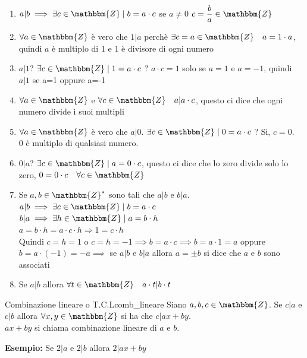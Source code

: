 \documentclass[12pt, letterpaper]{report}
\newcounter{theorem}
\newcommand{\nmu}{}
\begin{document}
		\begin{enumerate}
			\item $a|b \implies \exists c \in \mathbbm{Z} \mid b = a \cdot c$ se $a \neq 0$ $c = \dfrac{b}{a} \in \mathbbm{Z}$
			\item $\forall a \in \mathbbm{Z}$ è vero che $1|a$ perchè $\exists c=a \in \mathbbm{Z} \quad a = 1 \cdot a$, quindi $a$ è multiplo di 1 e 1 è divisore di ogni numero
			\item $a|1$? $\exists c \in \mathbbm{Z} \mid 1 = a \cdot c$ ? $a \cdot c = 1$ solo se $a=1$ e $a=-1$, quindi $a|1$ se a=1 oppure a=-1
			\item $\forall a \in \mathbbm{Z}$ e $\forall c \in \mathbbm{Z} \quad a|a \cdot c$, questo ci dice che ogni numero divide i suoi multipli
			\item $\forall a \in \mathbbm{Z}$ è vero che $a|0$. $\exists c \in \mathbbm{Z} \mid 0 = a \cdot c$ ? Si, $c = 0$. \\
			0 è multiplo di qualsiasi numero.
			\item $0|a$? $\exists c \in \mathbbm{Z} \mid a = 0 \cdot c$, questo ci dice che lo zero divide solo lo zero, $0=0 \cdot c \quad \forall c \in \mathbbm{Z}$
			\item Se $a,b \in \mathbbm{Z}^*$ sono tali che $a|b$ e $b|a$. \\
			$a|b \implies \exists c \in \mathbbm{Z} \mid b = a \cdot c$ \\
			$b|a \implies \exists h \in \mathbbm{Z} \mid a = b \cdot h$ \\
			$a = b \cdot h = a \cdot c \cdot h \Rightarrow 1 = c \cdot h$ \\
			Quindi $c=h=1$ o $c=h=-1 \implies b = a \cdot c \implies b = a \cdot 1 = a$ oppure $b = a \cdot (-1) = -a \implies$ se $a|b$ e $b|a$ allora $a=\pm b$ si dice che $a$ e $b$ sono associati
			\item Se $a|b$ allora $\forall t \in \mathbbm{Z} \quad a \cdot t|b \cdot t$
		\end{enumerate}
		\begin{theorem}{\nmu Combinazione lineare o T.C.L}{comb_lineare}
				Siano $a,b,c \in \mathbbm{Z}$. Se $c|a$ e $c|b$ allora $\forall x,y \in \mathbbm{Z}$ si ha che $c|ax + by$. \\
			$ax + by$ si chiama combinazione lineare di $a$ e $b$.
		\end{theorem}
		\textbf{Esempio:} Se $2|a$ e $2|b$ allora $2|ax + by$
\end{document}
